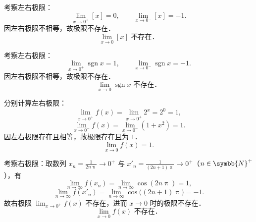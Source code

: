 \begin{solution}

    考察左右极限：
    \begin{equation}
        \lim_{x\to 0^+} [x] = 0, \qquad \lim_{x\to 0^-} [x] = -1.
    \end{equation}
    因左右极限不相等，故极限不存在．
    \begin{equation}
        \boxed{\lim_{x\to 0} [x] \text{ 不存在．}}
    \end{equation}


    考察左右极限：
    \begin{equation}
        \lim_{x\to 0^+} \operatorname{sgn} x = 1, \qquad \lim_{x\to 0^-} \operatorname{sgn} x = -1.
    \end{equation}
    因左右极限不相等，故极限不存在．
    \begin{equation}
        \boxed{\lim_{x\to 0} \operatorname{sgn} x \text{ 不存在．}}
    \end{equation}


    分别计算左右极限：
    \begin{equation}
        \lim_{x\to 0^+} f(x) = \lim_{x\to 0^+} 2^x = 2^0 = 1,
    \end{equation}
    \begin{equation}
        \lim_{x\to 0^-} f(x) = \lim_{x\to 0^-} (1 + x^2) = 1.
    \end{equation}
    因左右极限存在且相等，故极限存在且为 $1$．
    \begin{equation}
        \boxed{\lim_{x\to 0} f(x) = 1.}
    \end{equation}


    考察右极限：取数列 $x_n = \frac{1}{2n\uppi} \to 0^+$ 与 $x'_n = \frac{1}{(2n+1)\uppi} \to 0^+$（$n \in \symbb{N}^+$），有
    \begin{equation}
        \lim_{n\to\infty} f(x_n) = \lim_{n\to\infty} \cos(2n\uppi) = 1,
    \end{equation}
    \begin{equation}
        \lim_{n\to\infty} f(x'_n) = \lim_{n\to\infty} \cos\bigl( (2n+1)\uppi \bigr) = -1.
    \end{equation}
    故右极限 $\lim_{x\to 0^+} f(x)$ 不存在，进而 $x \to 0$ 时的极限不存在．
    \begin{equation}
        \boxed{\lim_{x\to 0} f(x) \text{ 不存在．}}
    \end{equation}
\end{solution}

